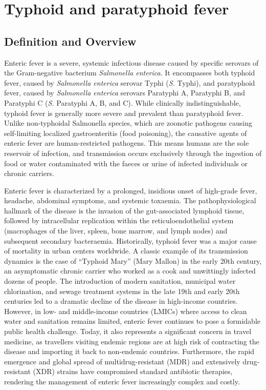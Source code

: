 \chapter{Typhoid and paratyphoid fever}

\section*{Definition and Overview}
Enteric fever is a severe, systemic infectious disease caused by specific serovars of the Gram-negative bacterium \textit{Salmonella enterica}. It encompasses both typhoid fever, caused by \textit{Salmonella enterica} serovar Typhi (\textit{S.} Typhi), and paratyphoid fever, caused by \textit{Salmonella enterica} serovars Paratyphi A, Paratyphi B, and Paratyphi C (\textit{S.} Paratyphi A, B, and C). While clinically indistinguishable, typhoid fever is generally more severe and prevalent than paratyphoid fever. Unlike non-typhoidal Salmonella species, which are zoonotic pathogens causing self-limiting localized gastroenteritis (food poisoning), the causative agents of enteric fever are human-restricted pathogens. This means humans are the sole reservoir of infection, and transmission occurs exclusively through the ingestion of food or water contaminated with the faeces or urine of infected individuals or chronic carriers.

Enteric fever is characterized by a prolonged, insidious onset of high-grade fever, headache, abdominal symptoms, and systemic toxaemia. The pathophysiological hallmark of the disease is the invasion of the gut-associated lymphoid tissue, followed by intracellular replication within the reticuloendothelial system (macrophages of the liver, spleen, bone marrow, and lymph nodes) and subsequent secondary bacteraemia. Historically, typhoid fever was a major cause of mortality in urban centers worldwide. A classic example of its transmission dynamics is the case of ``Typhoid Mary'' (Mary Mallon) in the early 20th century, an asymptomatic chronic carrier who worked as a cook and unwittingly infected dozens of people. The introduction of modern sanitation, municipal water chlorination, and sewage treatment systems in the late 19th and early 20th centuries led to a dramatic decline of the disease in high-income countries. However, in low- and middle-income countries (LMICs) where access to clean water and sanitation remains limited, enteric fever continues to pose a formidable public health challenge. Today, it also represents a significant concern in travel medicine, as travellers visiting endemic regions are at high risk of contracting the disease and importing it back to non-endemic countries. Furthermore, the rapid emergence and global spread of multidrug-resistant (MDR) and extensively drug-resistant (XDR) strains have compromised standard antibiotic therapies, rendering the management of enteric fever increasingly complex and costly.

